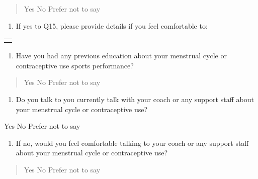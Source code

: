 \begin{quote}
Yes No Prefer not to say
\end{quote}

\begin{enumerate}
\def\labelenumi{\alph{enumi}.}
\item
  If yes to Q15, please provide details if you feel comfortable to:
\end{enumerate}

\begin{longtable}[]{@{}
  >{\raggedright\arraybackslash}p{}@{}}
\toprule\noalign{}
\begin{minipage}[b]{\linewidth}\raggedright
\end{minipage} \\
\midrule\noalign{}
\endhead
\bottomrule\noalign{}
\endlastfoot
\end{longtable}

\begin{enumerate}
\def\labelenumi{\arabic{enumi})}
\setcounter{enumi}{16}
\item
  Have you had any previous education about your menstrual cycle or
  contraceptive use sports performance?
\end{enumerate}

\begin{quote}
Yes No Prefer not to say
\end{quote}

\begin{enumerate}
\def\labelenumi{\arabic{enumi})}
\setcounter{enumi}{17}
\item
  Do you talk to you currently talk with your coach or any support staff
  about your menstrual cycle or contraceptive use?
\end{enumerate}

Yes No Prefer not to say

\begin{enumerate}
\def\labelenumi{\alph{enumi}.}
\item
  If no, would you feel comfortable talking to your coach or any support
  staff about your menstrual cycle or contraceptive use?
\end{enumerate}

\begin{quote}
Yes No Prefer not to say
\end{quote}
